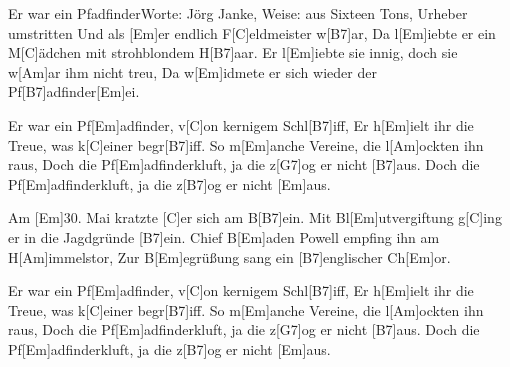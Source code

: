 \documentclass[../main.tex]{subfiles}
\begin{document}
\begin{song}{Er war ein Pfadfinder}{Worte: Jörg Janke, Weise: aus \glqq{}Sixteen Tons\grqq{}, Urheber umstritten}{}
Und als [Em]er endlich F[C]eldmeister w[B7]ar,
Da l[Em]iebte er ein M[C]{ä}dchen mit strohblondem H[B7]aar.
Er l[Em]iebte sie innig, doch sie w[Am]ar ihm nicht treu,
Da w[Em]idmete er sich wieder der Pf[B7]adfinder[Em]ei.

Er war ein Pf[Em]adfinder, v[C]on kernigem Schl[B7]iff,
Er h[Em]ielt ihr die Treue, was k[C]einer begr[B7]iff.
So m[Em]anche Vereine, die l[Am]ockten ihn raus,
Doch die Pf[Em]adfinderkluft, ja die z[G7]og er nicht [B7]aus.
Doch die Pf[Em]adfinderkluft, ja die z[B7]og er nicht [Em]aus.

Am [Em]30. Mai kratzte [C]er sich am B[B7]ein.
Mit Bl[Em]utvergiftung g[C]ing er in die Jagdgründe [B7]ein.
Chief B[Em]aden Powell empfing ihn am H[Am]immelstor,
Zur B[Em]egrüßung sang ein [B7]englischer Ch[Em]or.

Er war ein Pf[Em]adfinder, v[C]on kernigem Schl[B7]iff,
Er h[Em]ielt ihr die Treue, was k[C]einer begr[B7]iff.
So m[Em]anche Vereine, die l[Am]ockten ihn raus,
Doch die Pf[Em]adfinderkluft, ja die z[G7]og er nicht [B7]aus.
Doch die Pf[Em]adfinderkluft, ja die z[B7]og er nicht [Em]aus.

\end{song}
\end{document}
